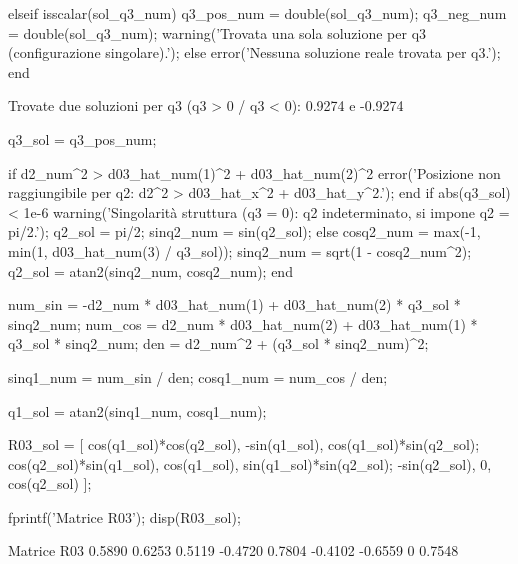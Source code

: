 \documentclass[11pt, a4paper]{article}
\begin{document}
\newpage
\begin{matlabcode}
elseif isscalar(sol_q3_num)
    q3_pos_num = double(sol_q3_num);
    q3_neg_num = double(sol_q3_num);
    warning('Trovata una sola soluzione per q3 (configurazione singolare).');
else
    error('Nessuna soluzione reale trovata per q3.');
end
\end{matlabcode}
\begin{matlaboutput}
Trovate due soluzioni per q3 (q3 > 0 / q3 < 0): 0.9274 e -0.9274
\end{matlaboutput}
\begin{matlabcode}
q3_sol = q3_pos_num;

if d2_num^2 > d03_hat_num(1)^2 + d03_hat_num(2)^2
    error('Posizione non raggiungibile per q2: d2^2 > d03_hat_x^2 + d03_hat_y^2.');
end
if abs(q3_sol) < 1e-6
    warning('Singolarità struttura (q3 = 0): q2 indeterminato, si impone q2 = pi/2.');
    q2_sol = pi/2;
    sinq2_num = sin(q2_sol);
else
    cosq2_num = max(-1, min(1, d03_hat_num(3) / q3_sol));
    sinq2_num = sqrt(1 - cosq2_num^2);
    q2_sol = atan2(sinq2_num, cosq2_num);
end


num_sin = -d2_num * d03_hat_num(1) + d03_hat_num(2) * q3_sol * sinq2_num;
num_cos = d2_num * d03_hat_num(2) + d03_hat_num(1) * q3_sol * sinq2_num;
den = d2_num^2 + (q3_sol * sinq2_num)^2;

sinq1_num = num_sin / den;
cosq1_num = num_cos / den;

q1_sol = atan2(sinq1_num, cosq1_num);


R03_sol = [ cos(q1_sol)*cos(q2_sol), -sin(q1_sol),  cos(q1_sol)*sin(q2_sol);
            cos(q2_sol)*sin(q1_sol),  cos(q1_sol),  sin(q1_sol)*sin(q2_sol);
            -sin(q2_sol),             0,            cos(q2_sol)           ];

fprintf('Matrice R03');
disp(R03_sol);
\end{matlabcode}
\begin{matlaboutput}
Matrice R03
    0.5890    0.6253    0.5119
   -0.4720    0.7804   -0.4102
   -0.6559         0    0.7548
\end{matlaboutput}
\end{document}
